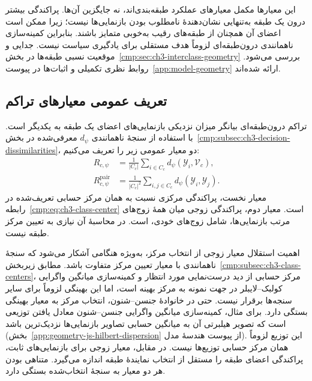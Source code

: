 این معیارها مکمل معیارهای عملکرد طبقه‌بندی‌اند،
نه جایگزین آن‌ها. پراکندگی بیشتر درون یک طبقه
به‌تنهایی نشان‌دهندهٔ نامطلوب بودن بازنمایی‌ها نیست؛
زیرا ممکن است اعضای آن همچنان از طبقه‌های رقیب
به‌خوبی متمایز باشند. بنابراین کمینه‌سازی ناهمانندی
درون‌طبقه‌ای لزوماً هدف مستقلی برای یادگیری سیاست
نیست. جدایی و موقعیت نسبی طبقه‌ها در
بخش~\ref{cmp:sec:ch3-interclass-geometry} بررسی می‌شود.
روابط نظری تکمیلی و اثبات‌ها در پیوست~\ref{app:model-geometry}
ارائه شده‌اند.

\subsection{تعریف عمومی معیارهای تراکم}
\label{cmp:subsec:ch3-within-class-compactness}
تراکم درون‌طبقه‌ای بیانگر میزان نزدیکی بازنمایی‌های
اعضای یک طبقه به یکدیگر است. با استفاده از سنجهٔ
ناهمانندی $d_\psi$ معرفی‌شده در
بخش~\ref{cmp:subsec:ch3-decision-dissimilarities}،
دو معیار عمومی زیر را تعریف می‌کنیم:
\begin{equation}\label{cmp:eq:ch3-compactness-general}
\begin{aligned}
R_{c,\psi}&=\frac1{|C_c|}\sum_{i\in C_c}
d_\psi(\mathscr Y_i,\mathcal V_c),\\
R_{c,\psi}^{\mathrm{pair}}&=\frac1{|C_c|^2}
\sum_{i,j\in C_c}d_\psi(\mathscr Y_i,\mathscr Y_j).
\end{aligned}
\end{equation}
معیار نخست، پراکندگی مرکزی نسبت به همان مرکز حسابی
تعریف‌شده در رابطه~\eqref{cmp:eq:ch3-class-center} است.
معیار دوم، پراکندگی زوجی میان همهٔ زوج‌های مرتب
بازنمایی‌ها، شامل زوج‌های خودی، است. در محاسبهٔ آن
نیازی به تعیین مرکز طبقه نیست.

اهمیت استقلال معیار زوجی از انتخاب مرکز، به‌ویژه
هنگامی آشکار می‌شود که سنجهٔ ناهمانندی با معیار
تعیین مرکز متفاوت باشد. مطابق زیربخش~\ref{cmp:subsec:ch3-class-centers}،
مرکز حسابی از دید درست‌نمایی مورد انتظار و کمینه‌سازی
میانگین واگرایی کولبک--لایبلر در جهت نمونه به مرکز
بهینه است، اما این بهینگی لزوماً برای سایر سنجه‌ها
برقرار نیست. حتی در خانوادهٔ جنسن--شنون، انتخاب
مرکز به معیار بهینگی بستگی دارد. برای مثال، کمینه‌سازی
میانگین واگرایی جنسن--شنون معادل یافتن توزیعی است که
تصویر هیلبرتی آن به میانگین حسابی تصاویر بازنمایی‌ها
نزدیک‌ترین باشد (بخش~\ref{app:geometry-js-hilbert-dispersion}
از پیوست هندسهٔ مدل). این توزیع لزوماً همان مرکز
حسابی توزیع‌ها نیست. در مقابل، معیار زوجی برای
بازنمایی‌های ثابت، پراکندگی اعضای طبقه را مستقل از
انتخاب نمایندهٔ طبقه اندازه می‌گیرد.
متناهی بودن هر دو معیار به سنجهٔ انتخاب‌شده بستگی دارد.

